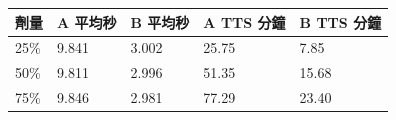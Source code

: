 \begin{tabular}{lllll}
\toprule
劑量 & A 平均秒 & B 平均秒 & A TTS 分鐘 & B TTS 分鐘\\
\midrule
25\% & 9.841 & 3.002 & 25.75 & 7.85\\
50\% & 9.811 & 2.996 & 51.35 & 15.68\\
75\% & 9.846 & 2.981 & 77.29 & 23.40\\
\bottomrule
\end{tabular}
